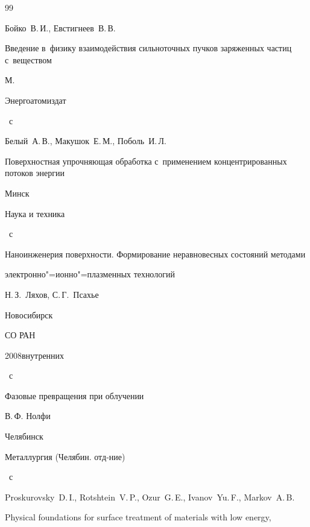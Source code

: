 \begin{thebibliography}{99}




\by Бойко~В.\,И., Евстигнеев~В.\,В.

\book Введение в~физику взаимодействия сильноточных пучков заряженных частиц с~веществом

\publaddr М.

\publ Энергоатомиздат


~с




\by Белый~А.\,В., Макушок~Е.\,М., Поболь~И.\,Л.

\book Поверхностная упрочняющая обработка с~применением концентрированных потоков энергии

\publaddr Минск

\publ Наука и техника


~с




\book Наноинженерия поверхности. Формирование неравновесных состояний методами

электронно"=ионно"=плазменных технологий

\ed Н.\,З.~Ляхов, С.\,Г.~Псахье

\publaddr  Новосибирск

\publ СО РАН

\yr 2008внутренних

~с




\book Фазовые превращения при облучении

\ed В.\,Ф. Нолфи

\publaddr Челябинск

\publ Металлургия (Челябин. отд-ние)


~с




\by  Proskurovsky~D.\,I., Rotshtein~V.\,P., Ozur~G.\,E., Ivanov~Yu.\,F., Markov~A.\,B.

\paper Physical foundations for surface treatment of materials with low energy,


\end{thebibliography}
